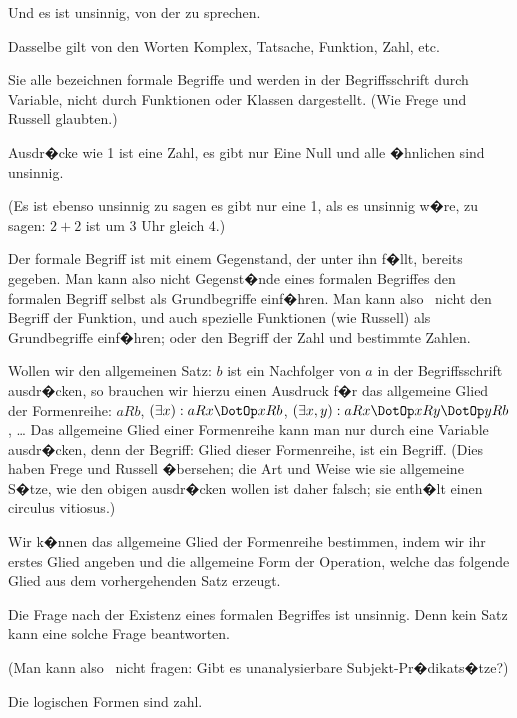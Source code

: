 \begin{propositions}
{Und es ist unsinnig, von der  zu sprechen.

Dasselbe gilt von den Worten \glqq{}Komplex\grqq{},
\glqq{}Tatsache\grqq{}, \glqq{}Funktion\grqq{}, \glqq{}Zahl\grqq{}, etc.

Sie alle bezeichnen formale Begriffe und werden
in der Begriffsschrift durch Variable, nicht durch
Funktionen oder Klassen dargestellt. (Wie Frege
und Russell glaubten.)

Ausdr�cke wie \glqq{}1 ist eine Zahl\grqq{}, \glqq{}es gibt nur
Eine Null\grqq{} und alle �hnlichen sind unsinnig.

(Es ist ebenso unsinnig zu sagen \glqq{}es gibt nur
eine 1\grqq{}, als es unsinnig w�re, zu sagen: $2 + 2$ ist
um 3 Uhr gleich 4.)}


{Der formale Begriff ist mit einem Gegenstand,
der unter ihn f�llt, bereits gegeben. Man kann
also nicht Gegenst�nde eines formalen Begriffes
 den formalen Begriff selbst als Grundbegriffe
einf�hren. Man kann also \zumBeispiel\ nicht den Begriff
der Funktion, und auch spezielle Funktionen (wie
Russell) als Grundbegriffe einf�hren; oder den
Begriff der Zahl und bestimmte Zahlen.}


{Wollen wir den allgemeinen Satz: \glqq{}$b$ ist ein
Nachfolger von $a$\grqq{} in der Begriffsschrift ausdr�cken,
so brauchen wir hierzu einen Ausdruck
f�r das allgemeine Glied der Formenreihe: $aRb$,
$(\exists x) : aRx \DotOp xRb$, $(\exists x,y) : aRx \DotOp xRy \DotOp yRb$, \ldots{} Das
allgemeine Glied einer Formenreihe kann man nur
durch eine Variable ausdr�cken, denn der Begriff:
Glied dieser Formenreihe, ist ein 
Begriff. (Dies haben Frege und Russell �bersehen;
die Art und Weise wie sie allgemeine
S�tze, wie den obigen ausdr�cken wollen ist daher
falsch; sie enth�lt einen circulus vitiosus.)

Wir k�nnen das allgemeine Glied der Formenreihe
bestimmen, indem wir ihr erstes Glied
angeben und die allgemeine Form der Operation,
welche das folgende Glied aus dem vorhergehenden
Satz erzeugt.}


{Die Frage nach der Existenz eines formalen
Begriffes ist unsinnig. Denn kein Satz kann eine
solche Frage beantworten.

(Man kann also \zumBeispiel\ nicht fragen: \glqq{}Gibt es
unanalysierbare Sub\-jekt-Pr�\-di\-kat\-s�t\-ze?\grqq{})}


{Die logischen Formen sind zahl.

}
\end{propositions}
